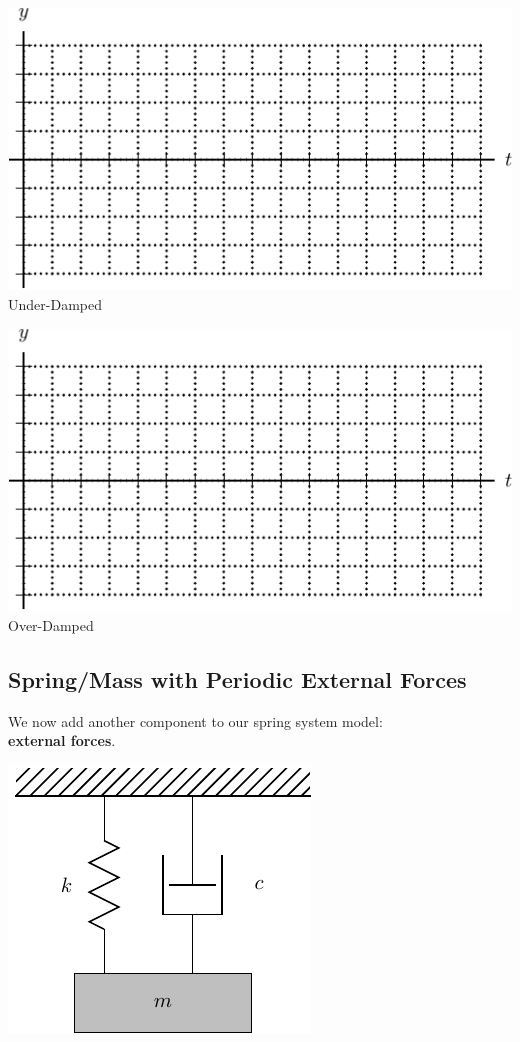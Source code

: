   \begin{minipage}[h]{0.475\linewidth}
    \begin{center}
      
   \vspace{0pt} 
   \includegraphics[width=0.9\linewidth]{graphics/notes_08_spring_mass_axes}\\
Under-Damped  

\hrulefill

   \includegraphics[width=0.9\linewidth]{graphics/notes_08_spring_mass_axes}\\
Over-Damped
    \end{center}
  \end{minipage}

\newpage
{}
\subsection*{Spring/Mass with Periodic External Forces }

We now add another component to our spring system model: \\{\bf
  external forces}.

 \includegraphics[width=0.3\linewidth]{graphics/notes_08_hanging_mass}

